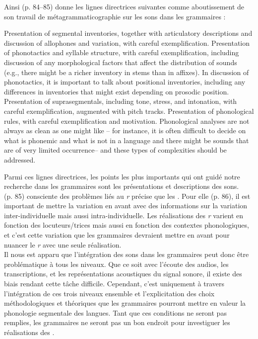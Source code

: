 Ainsi \citeauthor{riceSoundsGrammarWriting2014} (p. 84--85) donne les lignes directrices suivantes comme aboutissement de son travail de métagrammaticographie sur les sons dans les grammaires :
\begin{exe}
	\ex \begin{xlist}
	\ex Presentation of segmental inventories, together with articulatory descriptions and discussion of allophones and variation, with careful exemplification. 
	\ex Presentation of phonotactics and syllable structure, with careful exemplification, including discussion of any morphological factors that affect the distribution of sounds (e.g., there might be a richer inventory in stems than in affixes). In discussion of phonotactics, it is important to talk about positional inventories, including any differences in inventories that might exist depending on prosodic position.
	\ex Presentation of suprasegmentals, including tone, stress, and intonation, with careful exemplification, augmented with pitch tracks.
	\ex Presentation of phonological rules, with careful exemplification and motivation.
	\ex Phonological analyses are not always as clean as one might like – for instance, it is often difficult to decide on what is phonemic and what is not in a language and there might be sounds that are of very limited occurrence– and these types of complexities should be addressed.
	\end{xlist}
\end{exe}


Parmi ces lignes directrices, les points les plus importants qui ont guidé notre recherche dans les grammaires sont les présentations et descriptions des sons.\\

\citeauthor{riceSoundsGrammarWriting2014} (p. 85) consciente des problèmes liés au \textit{r} précise que les . Pour elle (p. 86), il est important de mettre la variation en avant avec des informations sur la variation inter-individuelle mais aussi intra-individuelle. Les réalisations des \textit{r} varient en fonction des locuteurs/trices mais aussi en fonction des contextes phonologiques, et c'est cette variation que les grammaires devraient mettre en avant pour nuancer le \textit{r} avec une seule réalisation.\\

Il nous est apparu que l'intégration des sons dans les grammaires peut donc être problématique à tous les niveaux. Que ce soit avec l'écoute des audios, les transcriptions, et les représentations acoustiques du signal sonore, il existe des biais rendant cette tâche difficile. Cependant, c'est uniquement à travers l'intégration de ces trois niveaux ensemble et l'explicitation des choix méthodologiques et théoriques que les grammaires pourront mettre en valeur la phonologie segmentale des langues. Tant que ces conditions ne seront pas remplies, les grammaires ne seront pas un bon endroit pour investiguer les réalisations des .


